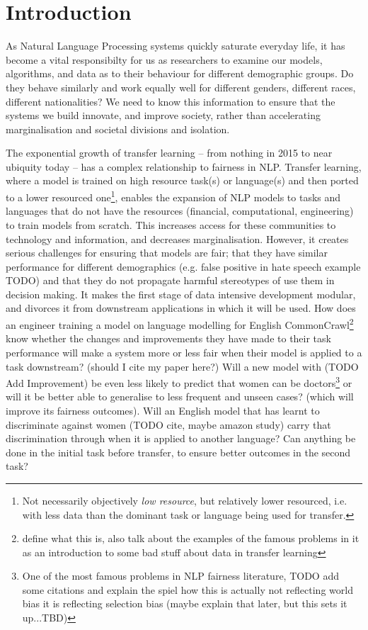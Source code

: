 \chapter{Introduction} \label{chapter:introduction}
As Natural Language Processing systems quickly saturate everyday life, it has become a vital responsibilty for us as researchers to examine our models, algorithms, and data as to their behaviour for different demographic groups. Do they behave similarly and work equally well for different genders, different races, different nationalities? We need to know this information to ensure that the systems we build innovate, and improve society, rather than accelerating marginalisation and societal divisions and isolation. 

The exponential growth of transfer learning -- from nothing in 2015 to near ubiquity today -- has a complex relationship to fairness in NLP. Transfer learning, where a model is trained on high resource task(s) or language(s) and then ported to a lower resourced one\footnote{Not necessarily objectively \textit{low resource}, but relatively lower resourced, i.e. with less data than the dominant task or language being used for transfer.}, enables the expansion of NLP models to tasks and languages that do not have the resources (financial, computational, engineering) to train models from scratch. This increases access for these communities %
to technology and information, and decreases marginalisation. However, it creates serious challenges for ensuring that models are fair; that they have similar performance for different demographics (e.g. false positive in hate speech example TODO) and that they do not propagate harmful stereotypes of use them in decision making. It makes the first stage of data intensive development modular, and divorces it from downstream applications in which it will be used. How does an engineer training a model on language modelling for English CommonCrawl\footnote{define what this is, also talk about the examples of the famous problems in it as an introduction to some bad stuff about data in transfer learning} know whether the changes and improvements they have made to their task performance will make a system more or less fair when their model is applied to a task downstream? (should I cite my paper here?)  Will a new model with (TODO Add Improvement) be even less likely to predict that women can be doctors\footnote{One of the most famous problems in NLP fairness literature, TODO add some citations and explain the spiel how this is actually not reflecting world bias it is reflecting selection bias (maybe explain that later, but this sets it up...TBD)} or will it be better able to generalise to less frequent and unseen cases? (which will improve its fairness outcomes). Will an English model that has learnt to discriminate against women (TODO cite, maybe amazon study) carry that discrimination through when it is applied to another language? Can anything be done in the initial task before transfer, to ensure better outcomes in the second task?
